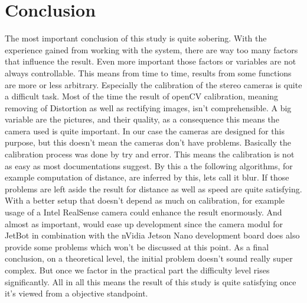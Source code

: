 \documentclass[journal,onecolumn]{IEEEtran}
\begin{document}
\section{Conclusion}
\noindent The most important conclusion of this study is quite sobering. With the experience gained from working with the system, there are way too many factors that influence the result. Even more important those factors or variables are not always controllable. This means from time to time, results from some functions are more or less arbitrary. Especially the calibration of the stereo cameras is quite a difficult task. Most of the time the result of openCV calibration, meaning removing of Distortion as well as rectifying images, isn't comprehensible. A big variable are the pictures, and their quality, as a consequence this means the camera used is quite important. In our case the cameras are designed for this purpose, but this doesn't mean the cameras don't have problems. Basically the calibration process was done by try and error. This means the calibration is not as easy as most documentations suggest. By this a the following algorithms, for example computation of distance, are inferred by this, lets call it blur. \newline
If those problems are left aside the result for distance as well as speed are quite satisfying. With a better setup that doesn't depend as much on calibration, for example usage of a Intel RealSense camera could enhance the result enormously. And almost as important, would ease up development since the camera modul for JetBot in combination with the nVidia Jetson Nano development board does also provide some problems which won't be discussed at this point. \newline
As a final conclusion, on a theoretical level, the initial problem doesn't sound really super complex. But once we factor in the practical part the difficulty level rises significantly. All in all this means the result of this study is quite satisfying once it's viewed from a objective standpoint.
\appendices

%
{}


%
\end{document}
